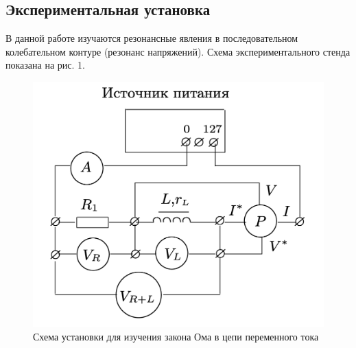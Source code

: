 \documentclass[12pt,a4paper]{article}
\begin{document}
\subsection*{Экспериментальная установка}
В данной работе изучаются резонансные явления в последователь­ном колебательном контуре (резонанс напряжений). 
Схема эксперимен­тального стенда показана на рис. 1. 
\begin{figure}
    \centering
    \includegraphics[width=\linewidth]{pics/scheme1.png}
    \caption{Схема установки для изучения закона Ома в цепи переменного тока}
\end{figure}
\end{document}
